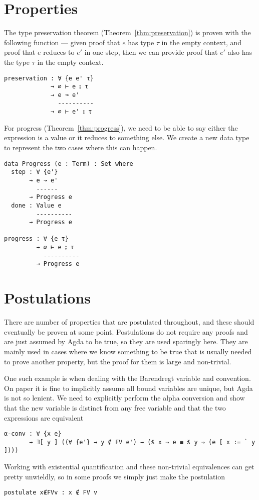 \section{Properties}
The type preservation theorem (Theorem~\ref{thm:preservation}) is proven
with the following function --- given proof that $e$ has type $\tau$ in the
empty context, and proof that $e$ reduces to $e'$ in one step, then we
can provide proof that $e'$ also has the type $\tau$ in the empty context.
\begin{verbatim}
preservation : ∀ {e e' τ}
             → ∅ ⊢ e ⦂ τ
             → e ↝ e'
               ----------
             → ∅ ⊢ e' ⦂ τ
\end{verbatim}
For progress (Theorem~\ref{thm:progress}), we need to be able to say
either the expression is a value or it reduces to something else. We
create a new data type to represent the two cases where this can
happen.
\begin{verbatim}
data Progress (e : Term) : Set where
  step : ∀ {e'}
       → e ↝ e'
         ------
       → Progress e
  done : Value e
         ----------
       → Progress e

progress : ∀ {e τ}
         → ∅ ⊢ e ⦂ τ
           ----------
         → Progress e
\end{verbatim}

\section{Postulations}
There are number of properties that are postulated throughout, and
these should eventually be proven at some point. Postulations do not
require any proofs and are just assumed by Agda to be true, so they
are used sparingly here. They are mainly used in cases where we
know something to be true that is usually needed to prove another
property, but the proof for them is large and non-trivial.

One such example is when dealing with the Barendregt variable and
convention. On paper it is fine to implicitly assume all bound
variables are unique, but Agda is not so lenient. We need to
explicitly perform the alpha conversion and show that the new variable
is distinct from any free variable and that the two expressions are
equivalent
\begin{verbatim}
α-conv : ∀ {x e}                                  
       → ∃[ y ] ((∀ {e'} → y ∉ FV e') → (ƛ x ⇒ e ≡ ƛ y ⇒ (e [ x := ` y ])))
\end{verbatim}
Working with existential quantification and these non-trivial
equivalences can get pretty unwieldly, so in some proofs we simply
just make the postulation
\begin{verbatim}
postulate x∉FVv : x ∉ FV v
\end{verbatim}

